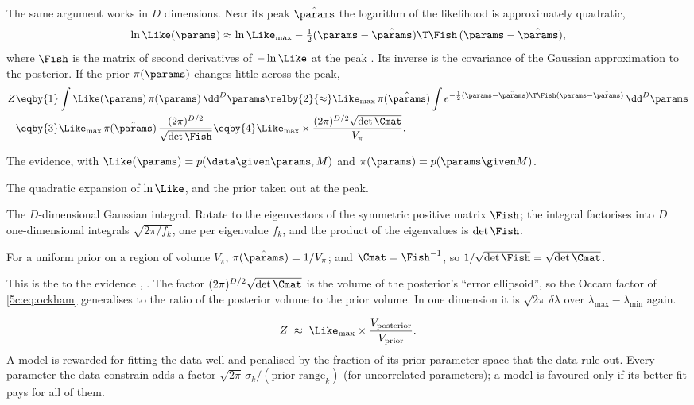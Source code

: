 The same argument works in $D$ dimensions. Near its peak $\hat\params$ the logarithm
of the likelihood is approximately quadratic,
\[
  \ln\Like(\params)\approx\ln\Like_{\max}-\tfrac12(\params-\hat\params)\T\Fish\,(\params-\hat\params),
\]
where $\Fish$ is the matrix of second derivatives of $-\ln\Like$ at the peak
. Its inverse is the covariance of the Gaussian approximation
to the posterior. If the prior $\pi(\params)$ changes little across the peak,
\begin{align}
  Z
  &\eqby{1}\int\Like(\params)\,\pi(\params)\,\dd^D\params
   \relby{2}{\approx}\Like_{\max}\,\pi(\hat\params)
     \int e^{-\frac12(\params-\hat\params)\T\Fish(\params-\hat\params)}\,\dd^D\params \nonumber\\
  &\eqby{3}\Like_{\max}\,\pi(\hat\params)\,\frac{(2\pi)^{D/2}}{\sqrt{\det\Fish}}
   \eqby{4}\Like_{\max}\times\frac{(2\pi)^{D/2}\sqrt{\det\Cmat}}{V_\pi} .
  \label{5c:eq:laplace-evidence}
\end{align}
\begin{explain}
  \item The evidence, with $\Like(\params)=p(\data\given\params,M)$ and
        $\pi(\params)=p(\params\given M)$.
  \item The quadratic expansion of $\ln\Like$, and the prior taken out at the peak.
  \item The $D$-dimensional Gaussian integral. Rotate to the eigenvectors of the
        symmetric positive matrix $\Fish$; the integral factorises into $D$
        one-dimensional integrals $\sqrt{2\pi/f_k}$, one per eigenvalue $f_k$, and the
        product of the eigenvalues is $\det\Fish$.
  \item For a uniform prior on a region of volume $V_\pi$, $\pi(\hat\params)=1/V_\pi$;
        and $\Cmat=\Fish^{-1}$, so $1/\sqrt{\det\Fish}=\sqrt{\det\Cmat}$.
\end{explain}
This is the  to the evidence
, \cite[eqs.~(24)--(25)]{Trotta2008}. The factor
$(2\pi)^{D/2}\sqrt{\det\Cmat}$ is the volume of the posterior's ``error ellipsoid'',
so the Occam factor of \eqref{5c:eq:ockham} generalises to the ratio of the posterior
volume to the prior volume. In one dimension it is $\sqrt{2\pi}\,\delta\lambda$ over
$\lambda_{\max}-\lambda_{\min}$ again.

\begin{keyidea}
\[
  Z\;\approx\;\Like_{\max}\times\frac{V_{\rm posterior}}{V_{\rm prior}} .
\]
A model is rewarded for fitting the data well and penalised by the fraction of its
prior parameter space that the data rule out. Every parameter the data constrain adds
a factor $\sqrt{2\pi}\,\sigma_k/(\text{prior range}_k)$ (for uncorrelated parameters); a model is favoured only if its
better fit pays for all of them.
\end{keyidea}

